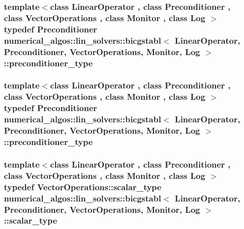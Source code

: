 \hypertarget{classnumerical__algos_1_1lin__solvers_1_1bicgstabl_ae6594eb67e1314591b179bcf6426cd42}{
\subsubsection[{preconditioner\-\_\-type}]{\setlength{\rightskip}{0pt plus 5cm}template$<$class Linear\-Operator , class Preconditioner , class Vector\-Operations , class Monitor , class Log $>$ typedef Preconditioner {\bf numerical\-\_\-algos\-::lin\-\_\-solvers\-::bicgstabl}$<$ Linear\-Operator, Preconditioner, Vector\-Operations, Monitor, Log $>$\-::{\bf preconditioner\-\_\-type}}}\label{classnumerical__algos_1_1lin__solvers_1_1bicgstabl_ae6594eb67e1314591b179bcf6426cd42}
\hypertarget{classnumerical__algos_1_1lin__solvers_1_1bicgstabl_ae6594eb67e1314591b179bcf6426cd42}{
\subsubsection[{preconditioner\-\_\-type}]{\setlength{\rightskip}{0pt plus 5cm}template$<$class Linear\-Operator , class Preconditioner , class Vector\-Operations , class Monitor , class Log $>$ typedef Preconditioner {\bf numerical\-\_\-algos\-::lin\-\_\-solvers\-::bicgstabl}$<$ Linear\-Operator, Preconditioner, Vector\-Operations, Monitor, Log $>$\-::{\bf preconditioner\-\_\-type}}}\label{classnumerical__algos_1_1lin__solvers_1_1bicgstabl_ae6594eb67e1314591b179bcf6426cd42}
\hypertarget{classnumerical__algos_1_1lin__solvers_1_1bicgstabl_a2756ac0272be9f905269641d9f74bb8e}{
\subsubsection[{scalar\-\_\-type}]{\setlength{\rightskip}{0pt plus 5cm}template$<$class Linear\-Operator , class Preconditioner , class Vector\-Operations , class Monitor , class Log $>$ typedef Vector\-Operations\-::scalar\-\_\-type {\bf numerical\-\_\-algos\-::lin\-\_\-solvers\-::bicgstabl}$<$ Linear\-Operator, Preconditioner, Vector\-Operations, Monitor, Log $>$\-::{\bf scalar\-\_\-type}}}\label{classnumerical__algos_1_1lin__solvers_1_1bicgstabl_a2756ac0272be9f905269641d9f74bb8e}
